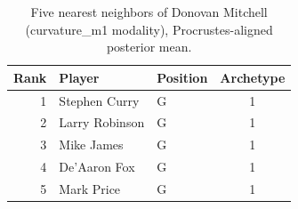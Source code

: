 \begin{table}[htbp]
  \centering\small
  \begin{tabular}{rllc}
    \toprule
    Rank & Player & Position & Archetype \\
    \midrule
    1 & Stephen Curry & G & 1 \\
    2 & Larry Robinson & G & 1 \\
    3 & Mike James & G & 1 \\
    4 & De'Aaron Fox & G & 1 \\
    5 & Mark Price & G & 1 \\
    \bottomrule
  \end{tabular}
  \caption{Five nearest neighbors of Donovan Mitchell (curvature_m1 modality), Procrustes-aligned posterior mean.}
  \label{tab:Donovan_Mitchell_neighbors_curvature_m1}
\end{table}

